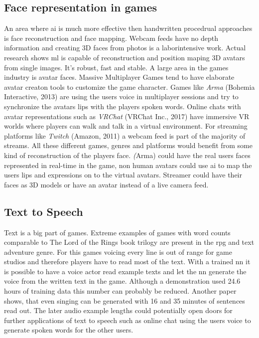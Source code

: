 \documentclass[10pt,a4paper]{article}
\begin{document}
\subsection{Face representation in games}
An area where \gls{ai} is much more effective then handwritten procedrual approaches is face reconstruction and face mapping. Webcam feeds have no depth information and creating 3D faces from photos is a laborintensive work. Actual research shows \gls{ml} is capable of reconstruction and position maping 3D avatars from single images. It's robust, fast and stable\cite{Feng2018}. A large area in the games industry is avatar faces. Massive Multiplayer Games tend to have elaborate avatar creaton tools to customize the game character. Games like \textit{Arma} (Bohemia Interactive, 2013) are using the users voice in multiplayer sessions and try to synchronize the avatars lips with the players spoken words. Online chats with avatar representations such as \textit{VRChat} (VRChat Inc., 2017) have immersive VR worlds where players can walk and talk in a virtual environment. For streaming platforms like \textit{Twitch} (Amazon, 2011) a webcam feed is part of the majority of streams. All these different games, genres and platforms would benefit from some kind of reconstruction of the players face. \textit(Arma) could have the real users faces represented in real-time in the game, non human avatars could use \gls{ai} to map the users lips and expressions on to the virtual avatars. Streamer could have their faces as 3D models or have an avatar instead of a live camera feed.

\subsection{Text to Speech}
Text is a big part of games. Extreme examples of games with word counts comparable to The Lord of the Rings book trilogy are present in the \gls{rpg} and text adventure genre. For this games voicing every line is out of range for game studios and therefore players have to read most of the text. With a trained \gls{nn} it is possible to have a voice actor read example texts and let the \gls{nn} generate the voice from the written text in the game\cite{Shen2017}. Although a demonstration used 24.6 hours of training data this number can probably be reduced. Another paper shows, that even singing can be generated with 16 and 35 minutes of sentences read out\cite{Blaauw2017}. The later audio example lengths could potentially open doors for further applications of text to speech such as online chat using the users voice to generate spoken words for the other users.
\end{document}
